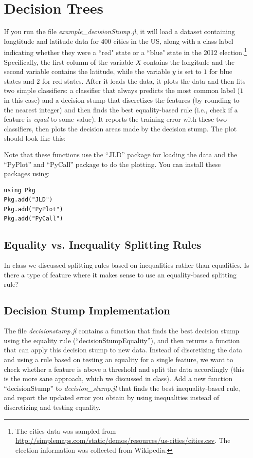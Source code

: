 \documentclass{article}
\def\blu#1{{\color{blu}#1}}
\begin{document}
\section{Decision Trees}

If you run the file \emph{example\_decisionStump.jl}, it will load a dataset containing longtitude and latitude data for 400 cities in the US, along with a class label indicating whether they were a ``red" state or a ``blue" state in the 2012 election.\footnote{The cities data was sampled from \url{http://simplemaps.com/static/demos/resources/us-cities/cities.csv}. The election information was collected from Wikipedia.} Specifically, the first column of the variable $X$ contains the longitude and the second variable contains the latitude, while the variable $y$ is set to $1$ for blue states and $2$ for red states. After it loads the data, it plots the data and then fits two simple classifiers: a classifier that always predicts the most common label ($1$ in this case) and a decision stump that discretizes the features (by rounding to the nearest integer) and then finds the best equality-based rule (i.e., check if a feature is \emph{equal} to some value). It reports the training error with these two classifiers, then plots the decision areas made by the decision stump. The plot should look like this:

Note that these functions use the ``JLD'' package for loading the data and the ``PyPlot'' and ``PyCall'' package to do the plotting. You can install these packages using:
\begin{verbatim}
using Pkg
Pkg.add("JLD")
Pkg.add("PyPlot")
Pkg.add("PyCall")
\end{verbatim}

\subsection{Equality vs. Inequality Splitting Rules}

In class we discussed splitting rules based on inequalities rather than equalities. \blu{Is there a type of feature where it makes sense to use 
an equality-based splitting rule?}




\subsection{Decision Stump Implementation}

The file \emph{decisionstump.jl} contains a function  that finds the best decision stump using the equality rule (``decisionStumpEquality''), and then returns a function that can apply this decision stump to new data. Instead of discretizing the data and using a rule based on testing an equality for a single feature, we want to check whether a feature is above a threshold and split the data accordingly (this is the more sane approach, which we discussed in class). \blu{Add a new function ``decisionStump'' to \emph{decision\_stump.jl} that finds the best inequality-based rule, and report the updated error you obtain by using inequalities instead of discretizing and testing equality.}
\end{document}

